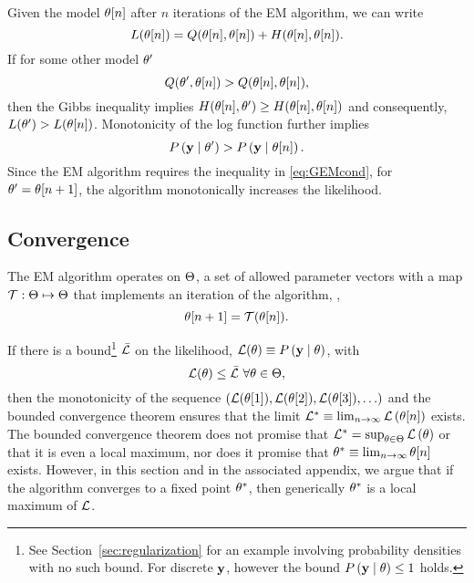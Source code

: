 Given the model ${\theta}{[n]}$ after $n$ iterations of the EM
algorithm, we can write
\begin{equation}
  L({\theta}{[n]}) = Q({\theta}{[n]}, {\theta}{[n]}) +
  H({\theta}{[n]}, {\theta}{[n]}).
\end{equation}
If for some other model $\theta'$
\begin{equation}
  \label{eq:GEMcond}
  Q(\theta',{\theta}{[n]}) >
  Q({\theta}{[n]},{\theta}{[n]}),
\end{equation}
then the Gibbs inequality implies $H({\theta}{[n]}, \theta') \geq H({\theta}{[n]},
{\theta}{[n]})$ and consequently, $L(\theta') >
L({\theta}{[n]})$.  Monotonicity of the log function further
implies
\begin{equation*}
  P \left(\mathbf{y} \mid \theta'\right) > P \left(\mathbf{y}\mid {\theta}{[n]} \right) .
\end{equation*}
Since the EM algorithm requires the inequality in \eqref{eq:GEMcond},
for $\theta' = {\theta}{[n+1]}$, the algorithm
monotonically increases the likelihood.

\subsection{Convergence}
%
The EM algorithm operates on $\Theta$, a set of allowed parameter
vectors with a map $\EMmap:\ParameterDomain \mapsto \ParameterDomain$ that implements an
iteration of the algorithm, \ie,
\begin{equation*}
  \ti{\parameters}{n+1} = \EMmap (\ti{\parameters}{n}).
\end{equation*}

If there is a bound\footnote{See Section~\ref{sec:regularization} for
  an example involving probability densities with no such bound.  For
  discrete $\mathbf{y}$, however the bound
  $ P \left(\mathbf{y}\mid \theta \right) \leq 1$ holds.}
$\bar \LikelihoodFunction$ on the likelihood,
$ \LikelihoodFunction(\parameters) \equiv P \left(\y\given \parameters
\right) $, with
\begin{equation*}
  \LikelihoodFunction(\parameters) \leq \bar \LikelihoodFunction ~ \forall \parameters \in \ParameterDomain,
\end{equation*}
then the monotonicity of the sequence
$\left( \LikelihoodFunction( \ti{\parameters}{1}),
  \LikelihoodFunction( \ti{\parameters}{2}), \LikelihoodFunction(
  \ti{\parameters}{3}), \ldots \right)$ and the bounded convergence
theorem ensures that the limit
$ \LikelihoodFunction^* \equiv \lim_{n\rightarrow \infty}
\LikelihoodFunction \left(\ti{\parameters}{n} \right) $ exists.  The
bounded convergence theorem does not promise that
$\LikelihoodFunction^* = \sup_{\parameters \in \ParameterDomain}
\LikelihoodFunction \left( \parameters \right)$ or that it is even a
local maximum, nor does it promise that
${\theta^*} \equiv \lim_{n \rightarrow \infty} {\theta}{[n]}$
exists.  However, in this section and in the associated appendix, we
argue that if the algorithm converges to a fixed point
$\theta^*$, then generically $\theta^*$ is a local maximum
of $\LikelihoodFunction$.

